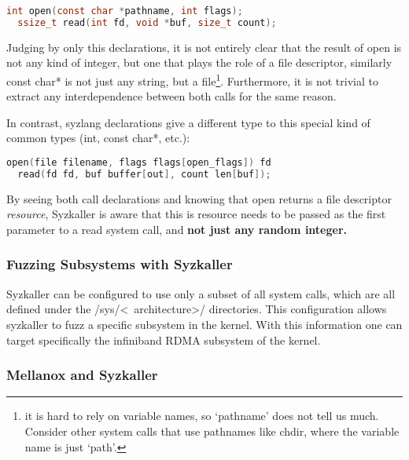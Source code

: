 \begin{lstlisting}[caption={Manpage C definitions for open and read}, language=c]
  int open(const char *pathname, int flags);
  ssize_t read(int fd, void *buf, size_t count);
\end{lstlisting}

Judging by only this declarations, it is not entirely clear that the result of open
is not any kind of integer, but one that plays the role of a file descriptor, similarly const char* is not
just any string, but a file\footnote{it is hard to rely on variable names, so `pathname' does not tell us much. Consider other system calls that use pathnames like chdir, where the variable name is just `path'.}. Furthermore,
it is not trivial to extract any interdependence between both calls for the same reason.

In contrast, syzlang declarations give a different type to this special kind of common types (int, const char*, etc.):

\begin{lstlisting}[caption={syzlang definitions for open and read}, label={lst:syzlangdefs}, language=c]
  open(file filename, flags flags[open_flags]) fd
  read(fd fd, buf buffer[out], count len[buf]);
\end{lstlisting}

By seeing both call declarations and knowing that open returns a file descriptor \emph{resource}, Syzkaller is aware
that this is resource needs to be passed as the first parameter to a read system call, and \textbf{not just any random integer.}

\subsubsection{Fuzzing Subsystems with Syzkaller}

Syzkaller can be configured to use only a subset of all system calls, which are all defined under
the /sys/\textless~architecture\textgreater/ directories. This configuration allows syzkaller to fuzz
a specific subsystem in the kernel. With this information one can target specifically
the infiniband RDMA subsystem of the kernel.


\subsubsection{Mellanox and Syzkaller}

